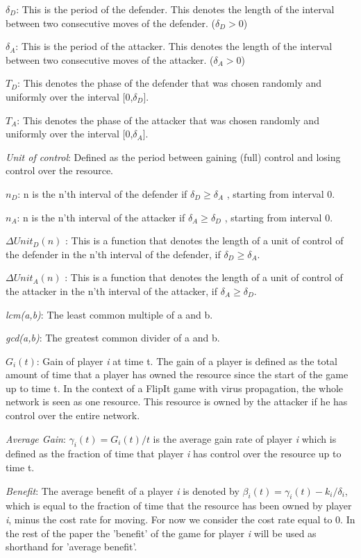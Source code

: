 \begin{description}
\item $\delta_{D}$: This is the period of the defender. This denotes the length of the interval between two consecutive moves of the defender. ($\delta_{D} > 0$)
\item $\delta_{A}$: This is the period of the attacker. This denotes the length of the interval between two consecutive moves of the attacker. ($\delta_{A} > 0$)
\item \textit{$T_{D}$}: This denotes the phase of the defender that was chosen randomly and uniformly over the interval [0,$\delta_{D}$].
\item \textit{$T_{A}$}: This denotes the phase of the attacker that was chosen randomly and uniformly over the interval [0,$\delta_{A}$].
\item \textit{Unit of control}: Defined as the period between gaining (full) control and losing control over the resource.  
\item $n_{D}$: n is the n'th interval of the defender if $\delta_{D} \geq \delta_{A}$ , starting from interval 0.
\item $n_{A}$: n is the n'th interval of the attacker if $\delta_{A} \geq \delta_{D}$ , starting from interval 0.
\item $\Delta Unit_{D}(n)$ : This is a function that denotes the length of a unit of control of the defender in the n'th interval of the defender, if $\delta_{D} \geq \delta_{A}$.
\item $\Delta Unit_{A}(n)$ : This is a function that denotes the length of a unit of control of the attacker in the n'th interval of the attacker, if $\delta_{A} \geq \delta_{D}$.
\item \textit{lcm(a,b)}: The least common multiple of a and b.
\item \textit{gcd(a,b)}: The greatest common divider of a and b.
\item $G_{i}(t)$: Gain of player \textit{i} at time t. The gain of a player is defined as the total amount of time that a player has owned the resource since the start of the game up to time t. In the context of a FlipIt game with virus propagation, the whole network is seen as one resource. This resource is owned by the attacker if he has control over the entire network.\\
\item \textit{Average Gain}:  $\gamma_{i}(t) = G_{i}(t)/t$ is the average gain rate of player \textit{i} which is defined as the fraction of time that player \textit{i} has control over the resource up to time t.
\item \textit{Benefit}: The average benefit of a player \textit{i} is denoted by $\beta_{i}(t) = \gamma_{i}(t) - k_{i} / \delta_{i}$, which is equal to the fraction of time that the resource has been owned by player \textit{i}, minus the cost rate for moving. For now we consider the cost rate equal to 0.
In the rest of the paper the 'benefit' of the game for player \textit{i} will be used as shorthand for 'average benefit'.

\end{description}
